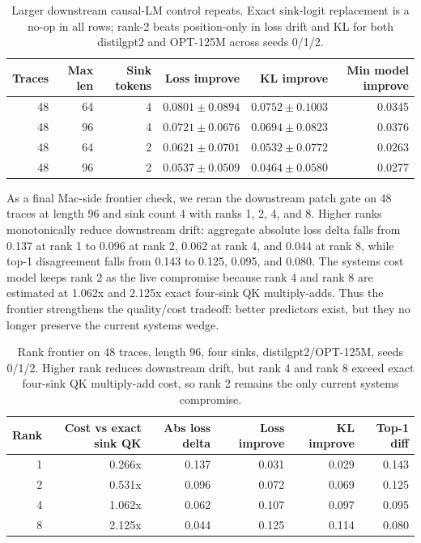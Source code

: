 \documentclass{article}
\begin{document}
\begin{table}[h]
\centering
\small
\begin{tabular}{rrrrrr}
\toprule
Traces & Max len & Sink tokens & Loss improve & KL improve & Min model improve \\
\midrule
48 & 64 & 4 & $0.0801 \pm 0.0894$ & $0.0752 \pm 0.1003$ & 0.0345 \\
48 & 96 & 4 & $0.0721 \pm 0.0676$ & $0.0694 \pm 0.0823$ & 0.0376 \\
48 & 64 & 2 & $0.0621 \pm 0.0701$ & $0.0532 \pm 0.0772$ & 0.0263 \\
48 & 96 & 2 & $0.0537 \pm 0.0509$ & $0.0464 \pm 0.0580$ & 0.0277 \\
\bottomrule
\end{tabular}
\caption{Larger downstream causal-LM control repeats. Exact sink-logit replacement is a no-op in all rows; rank-2 beats position-only in loss drift and KL for both distilgpt2 and OPT-125M across seeds 0/1/2.}
\end{table}

As a final Mac-side frontier check, we reran the downstream patch gate on 48
traces at length 96 and sink count 4 with ranks 1, 2, 4, and 8. Higher ranks
monotonically reduce downstream drift: aggregate absolute loss delta falls from
0.137 at rank 1 to 0.096 at rank 2, 0.062 at rank 4, and 0.044 at rank 8, while
top-1 disagreement falls from 0.143 to 0.125, 0.095, and 0.080. The systems
cost model keeps rank 2 as the live compromise because rank 4 and rank 8 are
estimated at 1.062x and 2.125x exact four-sink QK multiply-adds. Thus the
frontier strengthens the quality/cost tradeoff: better predictors exist, but
they no longer preserve the current systems wedge.

\begin{table}[h]
\centering
\small
\begin{tabular}{rrrrrr}
\toprule
Rank & Cost vs exact sink QK & Abs loss delta & Loss improve & KL improve & Top-1 diff \\
\midrule
1 & 0.266x & 0.137 & 0.031 & 0.029 & 0.143 \\
2 & 0.531x & 0.096 & 0.072 & 0.069 & 0.125 \\
4 & 1.062x & 0.062 & 0.107 & 0.097 & 0.095 \\
8 & 2.125x & 0.044 & 0.125 & 0.114 & 0.080 \\
\bottomrule
\end{tabular}
\caption{Rank frontier on 48 traces, length 96, four sinks, distilgpt2/OPT-125M, seeds 0/1/2. Higher rank reduces downstream drift, but rank 4 and rank 8 exceed exact four-sink QK multiply-add cost, so rank 2 remains the only current systems compromise.}
\end{table}
\end{document}
